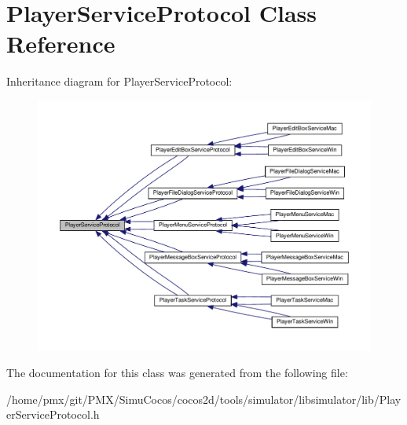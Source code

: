 \hypertarget{classPlayerServiceProtocol}{}\section{Player\+Service\+Protocol Class Reference}
\label{classPlayerServiceProtocol}


Inheritance diagram for Player\+Service\+Protocol\+:
\nopagebreak
\begin{figure}[H]
\begin{center}
\leavevmode
\includegraphics[width=350pt]{classPlayerServiceProtocol__inherit__graph}
\end{center}
\end{figure}


The documentation for this class was generated from the following file\+:\begin{DoxyCompactItemize}
\item 
/home/pmx/git/\+P\+M\+X/\+Simu\+Cocos/cocos2d/tools/simulator/libsimulator/lib/Player\+Service\+Protocol.\+h\end{DoxyCompactItemize}
